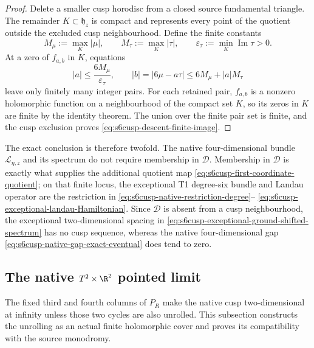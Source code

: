 \begin{proof}
Delete a smaller cusp horodisc from a closed source fundamental triangle.
The remainder \(K\subset\mathfrak h_z\) is compact and represents every
point of the quotient outside the excluded cusp neighbourhood.  Define the
finite constants
\begin{equation}\label{eq:s6cusp-descent-compact-bounds}
 M_\mu:=\max_K|\mu|,
 \qquad
 M_\tau:=\max_K|\tau|,
 \qquad
 \varepsilon_\tau:=\min_K\operatorname{Im}\tau>0.
\end{equation}
At a zero of \(f_{a,b}\) in \(K\), equations
\begin{equation}\label{eq:s6cusp-descent-pair-bounds}
 |a|\le\frac{6M_\mu}{\varepsilon_\tau},
 \qquad
 |b|=|6\mu-a\tau|
 \le6M_\mu+|a|M_\tau
\end{equation}
leave only finitely many integer pairs.  For each retained pair,
\(f_{a,b}\) is a nonzero holomorphic function on a neighbourhood of the
compact set \(K\), so its zeros in \(K\) are finite by the identity theorem.
The union over the finite pair set is finite, and the cusp exclusion proves
\eqref{eq:s6cusp-descent-finite-image}.
\end{proof}

The exact conclusion is therefore twofold.  The native four-dimensional
bundle \(\mathcal L_{\eta,z}\) and its spectrum do not require membership in
\(\mathscr D\).  Membership in \(\mathscr D\) is exactly what supplies the
additional quotient map \eqref{eq:s6cusp-first-coordinate-quotient}; on that
finite locus, the exceptional T1 degree-six bundle and Landau operator are
the restriction in \eqref{eq:s6cusp-native-restriction-degree}--
\eqref{eq:s6cusp-exceptional-landau-Hamiltonian}.  Since
\(\mathscr D\) is absent from a cusp neighbourhood, the exceptional
two-dimensional spacing in
\eqref{eq:s6cusp-exceptional-ground-shifted-spectrum} has no cusp sequence,
whereas the native four-dimensional gap
\eqref{eq:s6cusp-native-gap-exact-eventual} does tend to zero.

\subsection{The native \texorpdfstring{\(T^2\times\R^2\)}{T2 x R2}
pointed limit}

The fixed third and fourth columns of \(P_R\) make the native cusp
two-dimensional at infinity unless those two cycles are also unrolled.
This subsection constructs the unrolling as an actual finite holomorphic
cover and proves its compatibility with the source monodromy.

